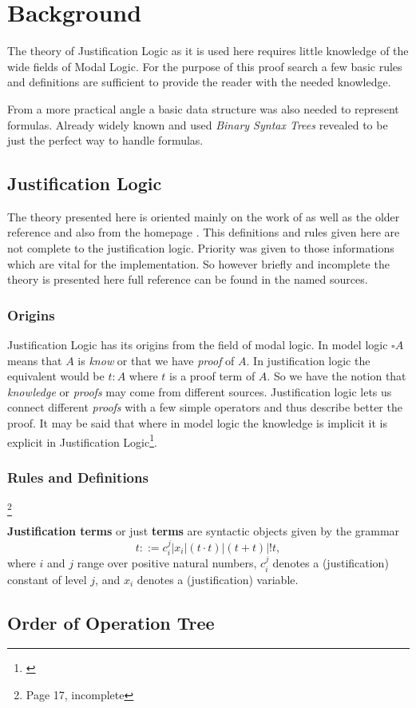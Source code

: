 \chapter{Background}
The theory of Justification Logic as it is used here requires little knowledge of the wide fields of Modal Logic. For the purpose of this proof search a few basic rules and definitions are sufficient to provide the reader with the needed knowledge. 
\par
From a more practical angle a basic data structure was also needed to represent formulas. Already widely known and used \emph{Binary Syntax Trees} revealed to be just the perfect way to handle formulas.

\section{Justification Logic}
 The theory presented here is oriented mainly on the work of \cite{goet} as well as the older reference \cite{art} and also from the homepage \cite{stan}. This definitions and rules given here are not complete to the justification logic. Priority was given to those informations which are vital for the implementation. So however briefly and incomplete the theory is presented here full reference can be found in the named sources. 

\subsection{Origins}
Justification Logic has its origins from the field of modal logic. 
In model logic $\square A$ means that $A$ is \emph{know} or that we have \emph{proof} of $A$. In justification logic the equivalent would be $t:A$ where $t$ is a proof term of $A$. So we have the notion that \emph{knowledge} or \emph{proofs} may come from different sources. Justification logic lets us connect different \emph{proofs} with a few simple operators and thus describe better the proof. It may be said that where in model logic the knowledge is implicit it is explicit in Justification Logic\footnote{\cite{goet}}.

\subsection{Rules and Definitions}

\begin{definition}\footnote{\cite{goet} Page 17, incomplete}

\textbf{Justification terms} or just \textbf{terms} are syntactic objects given by the grammar
\[
	t::= c_{i}^{j} | x_i | (t \cdot t) | (t+t) | !t,
\]
where $i$ and $j$ range over positive natural numbers, $c_{i}^{j}$ denotes a (justification) constant of level $j$, and $x_i$ denotes a (justification) variable.

\end{definition}

\section{Order of Operation Tree}
